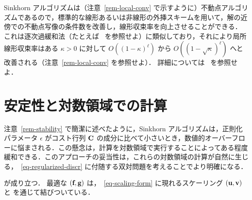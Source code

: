 \begin{rem}[外挿による加速]
	Sinkhorn アルゴリズムは（注意~\ref{rem-local-conv} で示すように）不動点アルゴリズムであるので，標準的な線形あるいは非線形の外挿スキームを用いて，解の近傍での不動点写像の条件数を改善し，線形収束率を向上させることができる．
	これは逐次過緩和法（たとえば~\citep{hadjidimos2000successive} を参照せよ）に類似しており，それにより局所線形収束率はある $\kappa>0$ に対して $O((1-\kappa)^\ell)$ から $O((1-\sqrt{\kappa})^\ell)$ へと改善される（注意~\ref{rem-local-conv} を参照せよ）．
	詳細については~\citep{2016-peyre-qot} を参照せよ．
\end{rem}



\section{安定性と対数領域での計算}

注意~\ref{rem-stability} で簡潔に述べたように，Sinkhorn アルゴリズムは，正則化パラメータ $\epsilon$ がコスト行列 $\mathrm{\textbf{C}}$ の成分に比べて小さいとき，数値的オーバーフローに悩まされる．この懸念は，計算を対数領域で実行することによってある程度緩和できる．このアプローチの妥当性は，これらの対数領域の計算が自然に生じる，~\eqref{eq-regularized-discr} に付随する双対問題を考えることでより明確になる．

\begin{prop}
が成り立つ．
%
最適な $(\mathrm{\textbf{f}},\mathrm{\textbf{g}})$ は，~\eqref{eq-scaling-form} に現れるスケーリング $(\mathrm{\textbf{u}},\mathrm{\textbf{v}})$ と
を通じて結びついている．
\end{prop}

